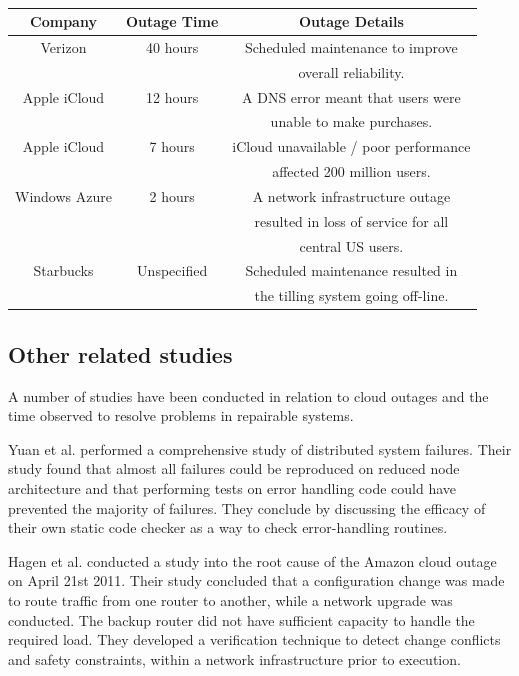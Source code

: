 \documentclass[conference]{IEEEtran}
\begin{document}
\begin {table}[]
\caption {}
\begin{flushleft}
\begin{tabular}{c | c |  c} Company & Outage Time & Outage Details 
\\ \hline Verizon	& 40 hours & Scheduled maintenance to  improve 
\\ & & overall reliability.
\\ Apple iCloud & 12 hours & A DNS error meant that users were 
\\ & & unable to make  purchases.
\\ Apple iCloud	& 7 hours & iCloud unavailable / poor performance 
\\ & & affected 200 million  users.
\\  Windows Azure & 2 hours & A network infrastructure outage  
\\ & & resulted in loss of service for all 
\\ & & central US users.
\\  Starbucks & Unspecified &  Scheduled maintenance resulted in 
\\ & & the tilling system going off-line.  \end{tabular}
\end{flushleft}
\end{table}



\subsection{Other related studies}
A number of studies have been conducted in relation to cloud outages and the time observed to resolve problems in repairable systems. \par

Yuan et al. \cite{yuan2014simple} performed a comprehensive study of distributed system failures. Their study found that almost all failures could be reproduced on reduced node architecture and that performing tests on error handling code could have prevented the majority of failures. They conclude by discussing the efficacy of their own static code checker as a way to check error-handling routines. \par

Hagen et al. \cite{hagen2012efficient} conducted a study into the root cause of the Amazon cloud outage on April 21st 2011. Their study concluded that a configuration change was made to route traffic from one router to another, while a network upgrade was conducted. The backup router did not have sufficient capacity to handle the required load. They developed a verification technique to detect change conflicts and safety constraints, within a network infrastructure prior to execution. \par
\end{document}
